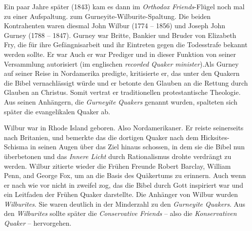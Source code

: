 \medskip

Ein paar Jahre später (1843) kam es dann im \textit{Orthodox Friends}-Flügel
noch mal zu einer Aufspaltung. zum Gurneyite-Wilburite-Spaltung. Die beiden
Kontrahenten waren diesmal John Wilbur (1774 -- 1856) und Joseph John Gurney
(1788 -- 1847). Gurney war Britte, Bankier und Bruder von Elizabeth Fry, die für
ihre Gefängnisarbeit und ihr Eintreten gegen die Todesstrafe bekannt werden
sollte. Er war Auch er war Prediger und in dieser Funktion von seiner
Versammlung autorisiert (im englischen \textit{recorded Quaker minister}).Als
Gurney auf seiner Reise in Nordamerika predigte, kritisierte er, das unter den
Quakern die Bibel vernachlässigt würde und er betonte den Glauben an die
Rettung durch Glauben an Christus. Somit vertrat er traditionellen
protestantische Theologie. Aus seinen Anhängern, die \textit{Gurneyite Quakers}
genannt wurden, spalteten sich später die evangelikalen Quaker ab.

\medskip

Wilbur war in Rhode Island geboren. Also Nordamerikaner. Er reiste seinerseits
nach Britanien, und bemerkte das die dortigen Quaker nach dem Hicksites-Schisma
in seinen Augen über das Ziel hinaus schossen, in dem sie die Bibel nun
überbetonen und das \textit{Innere Licht} durch Rationalismus drohte verdrängt
zu werden. Wilbur zitierte wieder die Frühen Freunde Robert Barclay, William
Penn, and George Fox, um an die Basis des Quäkertums zu erinnern. Auch wenn er
nach wie vor nicht in zweifel zog, das die Bibel durch Gott inspiriert war und
ein Leitfaden der Frühen Quaker darstellte. Die Anhänger von Wilbur wurden
\textit{Wilburites}. Sie waren deutlich in der Minderzahl zu den
\textit{Gurneyite Quakers}. Aus den \textit{Wilburites} sollte später die
\textit{Conservative Friends} -- also die \textit{Konservativen Quaker} --
hervorgehen.

\medskip

